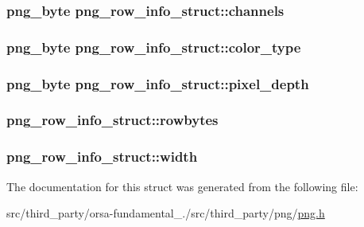 \subsubsection[{channels}]{\setlength{\rightskip}{0pt plus 5cm}png\+\_\+byte png\+\_\+row\+\_\+info\+\_\+struct\+::channels}\label{structpng__row__info__struct_a7cefee70361a3789a862001aefcd872f}
\hypertarget{structpng__row__info__struct_a646244422549c66e6661cfcdb67c8e28}{}
\subsubsection[{color\+\_\+type}]{\setlength{\rightskip}{0pt plus 5cm}png\+\_\+byte png\+\_\+row\+\_\+info\+\_\+struct\+::color\+\_\+type}\label{structpng__row__info__struct_a646244422549c66e6661cfcdb67c8e28}
\hypertarget{structpng__row__info__struct_a70b84917ef9eabc9b7d29ec96fd01153}{}
\subsubsection[{pixel\+\_\+depth}]{\setlength{\rightskip}{0pt plus 5cm}png\+\_\+byte png\+\_\+row\+\_\+info\+\_\+struct\+::pixel\+\_\+depth}\label{structpng__row__info__struct_a70b84917ef9eabc9b7d29ec96fd01153}
\hypertarget{structpng__row__info__struct_a924a208653f2577c05db5e1cf3aa5817}{}
\subsubsection[{rowbytes}]{ png\+\_\+row\+\_\+info\+\_\+struct\+::rowbytes}\label{structpng__row__info__struct_a924a208653f2577c05db5e1cf3aa5817}
\hypertarget{structpng__row__info__struct_a1ab107da5ffee8100eeaa76cc5ba3e62}{}
\subsubsection[{width}]{ png\+\_\+row\+\_\+info\+\_\+struct\+::width}\label{structpng__row__info__struct_a1ab107da5ffee8100eeaa76cc5ba3e62}


The documentation for this struct was generated from the following file\+:\begin{DoxyCompactItemize}
\item 
src/third\+\_\+party/orsa-\/fundamental\+\_./src/third\+\_\+party/png/\hyperlink{png_8h}{png.\+h}\end{DoxyCompactItemize}
